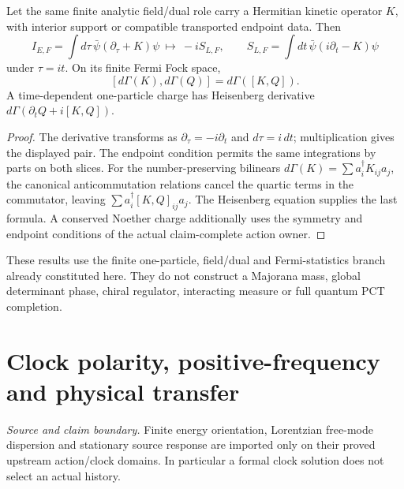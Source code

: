 \documentclass[12pt,a4paper]{article}
\begin{document}
\begin{theorem}
\label{p4:thm:finite-fermion-clock-real-form}
Let the same finite analytic field/dual role carry a Hermitian
kinetic operator \(K\), with interior support or compatible
transported endpoint data.  Then
\[
 I_{E,F}=\int d\tau\,\bar\psi(\partial_\tau+K)\psi
 \ \longmapsto\
 -iS_{L,F},\qquad
 S_{L,F}=\int dt\,\bar\psi(i\partial_t-K)\psi
\]
under \(\tau=it\).  On its finite Fermi Fock space,
\[
 [d\Gamma(K),d\Gamma(Q)]=d\Gamma([K,Q]).
\]
A time-dependent one-particle charge has Heisenberg derivative
\(d\Gamma(\partial_tQ+i[K,Q])\).
\end{theorem}
\begin{proof}
The derivative transforms as \(\partial_\tau=-i\partial_t\)
and \(d\tau=i\,dt\); multiplication gives the displayed pair.
The endpoint condition permits the same integrations by parts
on both slices.  For the number-preserving bilinears
\(d\Gamma(K)=\sum a_i^\dagger K_{ij}a_j\), the canonical
anticommutation relations cancel the quartic terms in the
commutator, leaving \(\sum a_i^\dagger[K,Q]_{ij}a_j\).
The Heisenberg equation supplies the last formula.  A conserved
Noether charge additionally uses the symmetry and endpoint
conditions of the actual claim-complete action owner.
\end{proof}

These results use the finite one-particle, field/dual and
Fermi-statistics branch already constituted here.  They do not
construct a Majorana mass, global determinant phase, chiral
regulator, interacting measure or full quantum PCT completion.




\section{Clock polarity, positive-frequency and physical transfer}
\label{p4b:sec:v238-b2}
\noindent\textit{Source and claim boundary.} Finite energy orientation, Lorentzian free-mode dispersion and stationary source response are imported only on their proved upstream action/clock domains. In particular a formal clock solution does not select an actual history.
\end{document}
